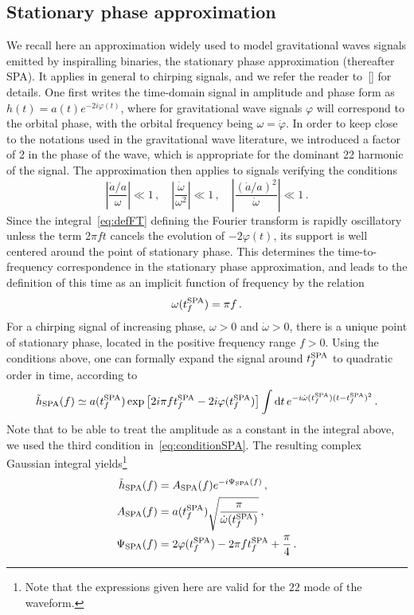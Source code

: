 \documentclass[aps,showpacs,%
prd,superscriptaddress,nofootinbib]{revtex4}
\newcommand{\be}{\begin{equation}}
\newcommand{\ee}{\end{equation}}
\newcommand\ud{{\mathrm{d}}}
\begin{document}

\subsection{Stationary phase approximation}
\label{subsec:SPA}

We recall here an approximation widely used to model gravitational waves signals emitted by inspiralling binaries, the stationary phase approximation (thereafter SPA). It applies in general to chirping signals, and we refer the reader to~\ref{} for details. One first writes the time-domain signal in amplitude and phase form as $h(t) = a(t) e^{-2i\varphi(t)}$, where for gravitational wave signals $\varphi$ will correspond to the orbital phase, with the orbital frequency being $\omega = \dot{\varphi}$. In order to keep close to the notations used in the gravitational wave literature, we introduced a factor of 2 in the phase of the wave, which is appropriate for the dominant 22 harmonic of the signal. The approximation then applies to signals verifying the conditions
\be\label{eq:conditionSPA}
	\left| \frac{\dot{a}/a}{\omega} \right| \ll 1\,, \quad \left|\frac{\dot{\omega}}{\omega^{2}} \right| \ll 1\,, \quad \left| \frac{(\dot{a}/a)^{2}}{\dot{\omega}} \right| \ll 1 \,.
\ee
Since the integral~\eqref{eq:defFT} defining the Fourier transform is rapidly oscillatory unless the term $2\pi f t$ cancels the evolution of $-2\varphi(t)$, its support is well centered around the point of stationary phase. This determines the time-to-frequency correspondence in the stationary phase approximation, and leads to the definition of this time as an implicit function of frequency by the relation
\be\label{eq:deftfSPA}
	\omega(t_{f}^{\rm SPA}) = \pi  f \,.
\ee
For a chirping signal of increasing phase, $\omega>0$ and $\dot{\omega}>0$, there is a unique point of stationary phase, located in the positive frequency range $f>0$. Using the conditions above, one can formally expand the signal around $t_{f}^{\rm SPA}$ to quadratic order in time, according to
\be
	\tilde{h}_{\rm SPA} (f) \simeq a(t_{f}^{\rm SPA}) \exp\left[2i\pi f t_{f}^{\rm SPA}-2i\varphi(t_{f}^{\rm SPA}) \right]  \int \ud t \, e^{-i \dot{\omega} (t_{f}^{\rm SPA}) (t-t_{f}^{\rm SPA})^{2}} \,.
\ee
Note that to be able to treat the amplitude as a constant in the integral above, we used the third condition in~\eqref{eq:conditionSPA}. The resulting complex Gaussian integral yields\footnote{Note that the expressions given here are valid for the $22$ mode of the waveform.}
\begin{subequations}
\begin{align}
	\tilde{h}_{\rm SPA}(f) &= A_{\rm SPA}(f) e^{-i\Psi_{\rm SPA}(f)} \,, \\
	A_{\rm SPA}(f) &= a(t_{f}^{\rm SPA}) \sqrt{\frac{\pi}{\dot{\omega}(t_{f}^{\rm SPA})}} \,, \\
	\Psi_{\rm SPA}(f) &= 2\varphi(t_{f}^{\rm SPA}) - 2\pi f t_{f}^{\rm SPA} + \frac{\pi}{4} \,.
\end{align}
\end{subequations}
\end{document}

